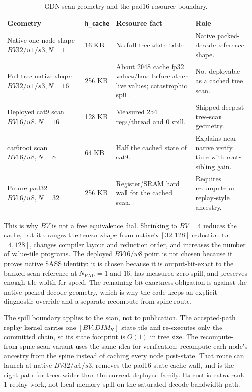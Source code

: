 \documentclass[conference]{IEEEtran}
\newcommand{\code}[1]{\texttt{#1}}
\newcommand{\rowsep}{\specialrule{0.15pt}{1.2pt}{1.2pt}}
\begin{document}
\begin{table}[t]
\caption{GDN scan geometry and the pad16 resource boundary.}
\label{tab:bv-npad}
\centering
\scriptsize
\begin{adjustbox}{width=\columnwidth}
\begin{tabular}{L{0.27\columnwidth} C{0.15\columnwidth} L{0.25\columnwidth} L{0.25\columnwidth}}
\toprule
Geometry & \code{h\_cache} & Resource fact & Role \\
\midrule
Native one-node shape \(BV32/w1/s3, N=1\) & 16 KB & No full-tree state table. & Native packed-decode reference shape. \\
\rowsep
Full-tree native shape \(BV32/w1/s3, N=16\) & 256 KB & About 2048 cache fp32 values/lane before other live values; catastrophic spill. & Not deployable as a cached tree scan. \\
\rowsep
Deployed cat9 scan \(BV16/w8, N=16\) & 128 KB & Measured 254 regs/thread and 0 spill. & Shipped deepest tree-scan geometry. \\
\rowsep
cat6root scan \(BV16/w8, N=8\) & 64 KB & Half the cached state of cat9. & Explains near-native verify time with root-sibling gain. \\
\rowsep
Future pad32 \(BV16/w8, N=32\) & 256 KB & Register/SRAM hard wall for the cached scan. & Requires recompute or replay-style ancestry. \\
\bottomrule
\end{tabular}
\end{adjustbox}
\end{table}

This is why \(BV\) is not a free equivalence dial. Shrinking to \(BV=4\) reduces the cache, but it changes the tensor shape from native's \([32,128]\) reduction to \([4,128]\), changes compiler layout and reduction order, and increases the number of value-tile programs. The deployed \(BV16/w8\) point is not chosen because it proves native SASS identity; it is chosen because it is output-bit-exact to the banked scan reference at \(N_{\mathrm{PAD}}=1\) and \(16\), has measured zero spill, and preserves enough tile width for speed. The remaining bit-exactness obligation is against the native packed-decode geometry, which is why the code keeps an explicit diagnostic override and a separate recompute-from-spine route.

The spill boundary applies to the scan, not to publication. The accepted-path replay kernel carries one \([BV,DIM_K]\) state tile and re-executes only the committed chain, so its state footprint is \(O(1)\) in tree size. The recompute-from-spine scan variant uses the same idea for verification: recompute each node's ancestry from the spine instead of caching every node post-state. That route can launch at native \(BV32/w1/s3\), removes the pad16 state-cache wall, and is the right path for trees wider than the current deployed family. Its cost is extra rank-1 replay work, not local-memory spill on the saturated decode bandwidth path.
\end{document}
